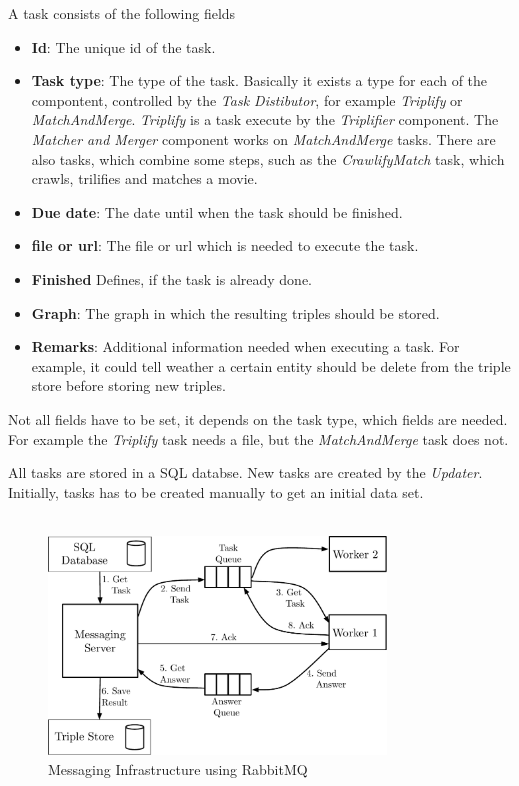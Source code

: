 A task consists of the following fields
\begin{itemize}
  \item \textbf{Id}: 
  The unique id of the task.
  \item \textbf{Task type}:
   The type of the task.
  Basically it exists a type for each of the compontent, controlled by the \textit{Task Distibutor}, for example \textit{Triplify} or \textit{MatchAndMerge}.
  \textit{Triplify} is a task execute by the \textit{Triplifier} component.
  The \textit{Matcher and Merger} component works on \textit{MatchAndMerge} tasks.
  There are also tasks, which combine some steps, such as the \textit{CrawlifyMatch} task, which crawls, trilifies and matches a movie.
  \item \textbf{Due date}: 
  The date until when the task should be finished.
  \item \textbf{file or url}: 
  The file or url which is needed to execute the task.
  \item \textbf{Finished}
  Defines, if the task is already done.
  \item \textbf{Graph}: 
  The graph in which the resulting triples should be stored.
  \item \textbf{Remarks}: 
  Additional information needed when executing a task.
  For example, it could tell weather a certain entity should be delete from the triple store before storing new triples.
\end{itemize}
Not all fields have to be set, it depends on the task type, which fields are needed.
For example the \textit{Triplify} task needs a file, but the \textit{MatchAndMerge} task does not.

All tasks are stored in a SQL databse.
New tasks are created by the \textit{Updater}.
Initially, tasks has to be created manually to get an initial data set.
\\ \\

\begin{figure}[ht]
  \begin{center}
  \includegraphics[width=0.8\textwidth]{images/rabbit_mq.pdf}
  \end{center}
  \caption{Messaging Infrastructure using RabbitMQ}
  \label{fig_messaging_infrastructure}
\end{figure}

